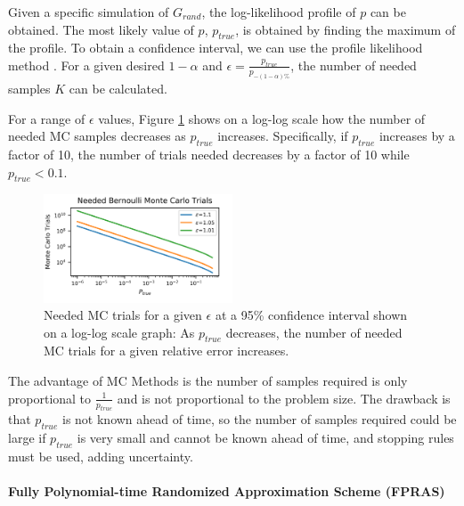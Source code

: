 \documentclass[12pt,twocolumn]{article}
\begin{document}
Given a specific simulation of \(G_{rand}\), the log-likelihood profile of \(p\) can be obtained. The most likely value of \(p\), \(p_{true}\), is obtained by finding the maximum of the profile. To obtain a confidence interval, we can use the profile likelihood method \cite{venzon1988method}. For a given desired \(1-\alpha\) and \(\epsilon=\frac{p_{true}}{p_{-(1-\alpha)\%}}\), the number of needed samples \(K\) can be calculated.

For a range of \(\epsilon\) values, Figure \ref{fig:MC Trial Graph} shows on a log-log scale how the number of needed MC samples decreases as \(p_{true}\) increases. Specifically, if \(p_{true}\) increases by a factor of 10, the number of trials needed decreases by a factor of 10 while \(p_{true}<0.1\).

\begin{figure}[t]
\caption{Needed MC trials for a given $\epsilon$ at a 95\% confidence interval shown on a log-log scale graph: As $p_{true}$ decreases, the number of needed MC trials for a given relative error increases.}
\label{fig:MC Trial Graph}
\includegraphics[width=0.5\textwidth]{../figures/MCTrials.png}
\end{figure}

The advantage of MC Methods is the number of samples required is only proportional to \(\frac{1}{p_{true}}\) and is not proportional to the problem size. The drawback is that \(p_{true}\) is not known ahead of time, so the number of samples required could be large if \(p_{true}\) is very small and cannot be known ahead of time, and stopping rules must be used, adding uncertainty.

\hypertarget{fully-polynomial-time-randomized-approximation-scheme-fpras}{%
\paragraph{\texorpdfstring{Fully Polynomial-time Randomized Approximation Scheme (FPRAS)\\
}{Fully Polynomial-time Randomized Approximation Scheme (FPRAS) }}\label{fully-polynomial-time-randomized-approximation-scheme-fpras}}
\end{document}
